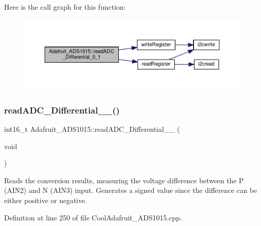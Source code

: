 Here is the call graph for this function\+:\nopagebreak
\begin{figure}[H]
\begin{center}
\leavevmode
\includegraphics[width=350pt]{class_adafruit___a_d_s1015_a56582333958e66efaccd3d4a8a47e3ff_cgraph}
\end{center}
\end{figure}
\mbox{\label{class_adafruit___a_d_s1015_a38311881bcab46f7496c4bb6e4cad576}} 
\subsubsection{\texorpdfstring{read\+A\+D\+C\+\_\+\+Differential\+\_\+\_()}{readADC\_Differential\_2\_3()}}
{\footnotesize\ttfamily int16\+\_\+t Adafruit\+\_\+\+A\+D\+S1015\+::read\+A\+D\+C\+\_\+\+Differential\+\_\+\_ (\begin{DoxyParamCaption}\item[{void}]{ }\end{DoxyParamCaption})}



Reads the conversion results, measuring the voltage difference between the P (A\+I\+N2) and N (A\+I\+N3) input. Generates a signed value since the difference can be either positive or negative. 



Definition at line 250 of file Cool\+Adafruit\+\_\+\+A\+D\+S1015.\+cpp.

